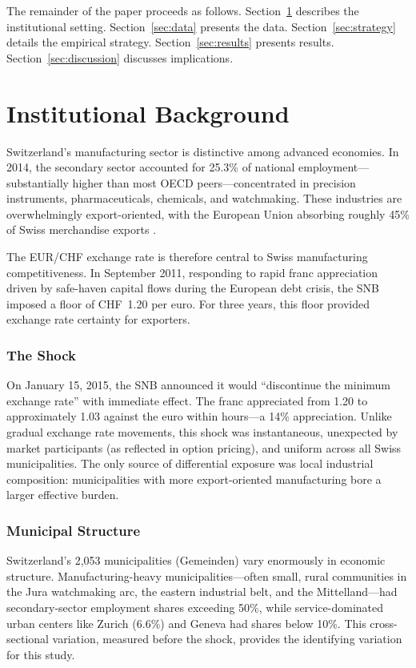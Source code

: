 \documentclass[12pt]{article}
\begin{document}
The remainder of the paper proceeds as follows. Section~\ref{sec:background} describes the institutional setting. Section~\ref{sec:data} presents the data. Section~\ref{sec:strategy} details the empirical strategy. Section~\ref{sec:results} presents results. Section~\ref{sec:discussion} discusses implications.


\section{Institutional Background}
\label{sec:background}

Switzerland's manufacturing sector is distinctive among advanced economies. In 2014, the secondary sector accounted for 25.3\% of national employment---substantially higher than most OECD peers---concentrated in precision instruments, pharmaceuticals, chemicals, and watchmaking. These industries are overwhelmingly export-oriented, with the European Union absorbing roughly 45\% of Swiss merchandise exports \citep{seco2015trade}.

The EUR/CHF exchange rate is therefore central to Swiss manufacturing competitiveness. In September 2011, responding to rapid franc appreciation driven by safe-haven capital flows during the European debt crisis, the SNB imposed a floor of CHF~1.20 per euro. For three years, this floor provided exchange rate certainty for exporters.

\subsubsection*{The Shock} On January 15, 2015, the SNB announced it would ``discontinue the minimum exchange rate'' with immediate effect. The franc appreciated from 1.20 to approximately 1.03 against the euro within hours---a 14\% appreciation. Unlike gradual exchange rate movements, this shock was instantaneous, unexpected by market participants (as reflected in option pricing), and uniform across all Swiss municipalities. The only source of differential exposure was local industrial composition: municipalities with more export-oriented manufacturing bore a larger effective burden.

\subsubsection*{Municipal Structure} Switzerland's 2,053 municipalities (Gemeinden) vary enormously in economic structure. Manufacturing-heavy municipalities---often small, rural communities in the Jura watchmaking arc, the eastern industrial belt, and the Mittelland---had secondary-sector employment shares exceeding 50\%, while service-dominated urban centers like Zurich (6.6\%) and Geneva had shares below 10\%. This cross-sectional variation, measured before the shock, provides the identifying variation for this study.
\end{document}
